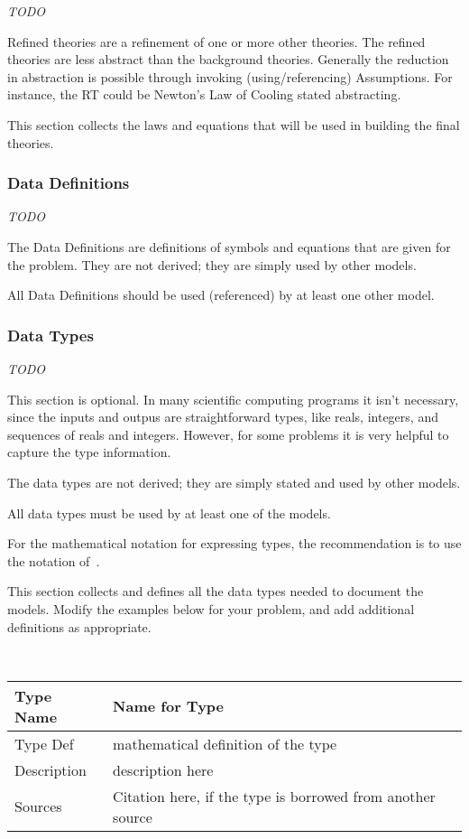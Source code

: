 \documentclass[12pt]{article}
\newcommand{\colAwidth}{0.13\textwidth}
\newcommand{\colBwidth}{0.82\textwidth}
\begin{document}
\emph{TODO}

Refined theories are a refinement of one or more other theories. The refined theories are less abstract than the background theories.  Generally the reduction in
abstraction is possible through invoking (using/referencing) Assumptions. For
instance, the RT could be Newton's Law of Cooling stated abstracting.

This section collects the laws and equations that will be used in building the
final theories.

\subsubsection{Data Definitions}\label{sec_datadef}

\emph{TODO}

The Data Definitions are definitions of symbols and equations that are given for
the problem.  They are not derived; they are simply used by other models.

All Data Definitions should be used (referenced) by at least one other model.


\subsubsection{Data Types}\label{sec_datatypes}

\emph{TODO}

This section is optional.  In many scientific computing programs it isn't
necessary, since the inputs and outpus are straightforward types, like reals,
integers, and sequences of reals and integers.  However, for some problems it is
very helpful to capture the type information.

The data types are not derived; they are simply stated and used by other models.

All data types must be used by at least one of the models.

For the mathematical notation for expressing types, the recommendation is to use
the notation of~\citet{HoffmanAndStrooper1995}.

This section collects and defines all the data types needed to document the
models. Modify the examples below for your problem, and add additional
definitions as appropriate.

~\newline

\noindent
\begin{minipage}{\textwidth}
\renewcommand*{\arraystretch}{1.5}
\begin{tabular}{| p{\colAwidth} | p{\colBwidth}|}
  \hline
  \rowcolor[gray]{0.9}
  Type Name & Name for Type\\
  \hline
  Type Def & mathematical definition of the type\\
  \hline
  Description & description here
  \\
  \hline
  Sources & Citation here, if the type is borrowed from another source\\
  \hline
\end{tabular}
\end{minipage}\\
\end{document}
